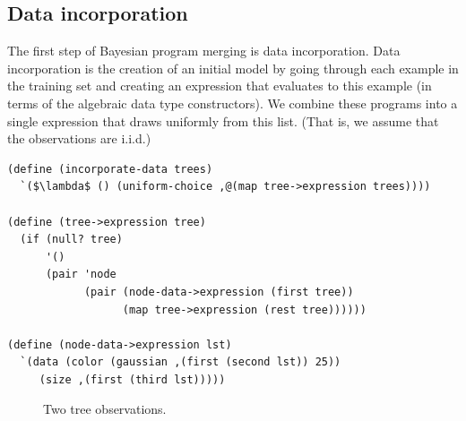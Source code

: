\documentclass[a4paper,10pt]{article}
\begin{document}
\subsection{Data incorporation}
The first step of Bayesian program merging is data incorporation.  Data incorporation is the creation of an initial model by going through each example in the training set and creating an expression that evaluates to this example (in terms of the algebraic data type constructors).  We combine these programs into a single expression that draws uniformly from this list. (That is, we assume that the observations are i.i.d.) 
\begin{lstlisting}[frame=trblsingle]
(define (incorporate-data trees)
  `($\lambda$ () (uniform-choice ,@(map tree->expression trees))))

(define (tree->expression tree)
  (if (null? tree)
      '()
      (pair 'node
            (pair (node-data->expression (first tree)) 
                  (map tree->expression (rest tree))))))

(define (node-data->expression lst)
  `(data (color (gaussian ,(first (second lst)) 25)) 
	 (size ,(first (third lst)))))
\end{lstlisting}

\begin{figure}[t]
  \subfloat{}
  \hspace{40pt} %
\caption{Two tree observations.}
\label{fig:tree-obs}
\end{figure}
\end{document}
